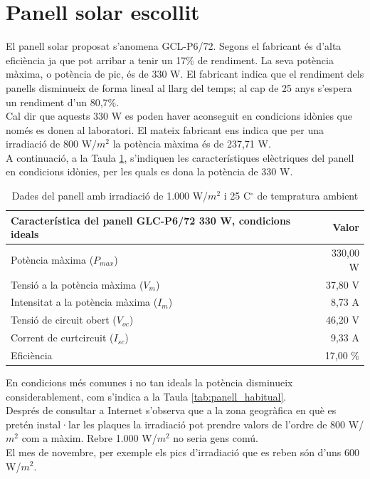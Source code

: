 \section{Panell solar escollit}
El panell solar proposat s'anomena GCL-P6/72. Segons el fabricant és d'alta eficiència ja que pot arribar a tenir un 17\% de rendiment. La seva potència màxima, o potència de pic, és de 330 W. El fabricant indica que el rendiment dels panells disminueix de forma lineal al llarg del temps; al cap de 25 anys s'espera un rendiment d'un 80,7\%.\\
\newline Cal dir que aquests 330 W es poden haver aconseguit en condicions idònies que només es donen al laboratori. El mateix fabricant ens indica que per una irradiació de 800 W/$m^2$ la potència màxima és de 237,71 W.\\
\newline A continuació, a la Taula \ref{tab:panell_ideal}, s'indiquen les característiques elèctriques del panell en condicions idònies, per les quals es dona la potència de 330 W.

\begin{table}[H]
\small
  \centering
    \begin{tabular} {|l|r|}
 \hline  
 \multicolumn{1}{|l|}{Característica del panell GLC-P6/72 330 W, condicions ideals} &  \multicolumn{1}{r|}{Valor} \\ \hline \hline
	Potència màxima ($P_{max}$) & 330,00 W \\ \hline
	Tensió a la potència màxima ($V_m$) & 37,80 V \\ \hline
	Intensitat a la potència màxima ($I_m$) & 8,73 A \\ \hline
	Tensió de circuit obert ($V_{oc}$) & 46,20 V \\ \hline
	Corrent de curtcircuit ($I_{sc}$) & 9,33 A \\ \hline
	Eficiència & 17,00 \% \\ \hline
    \end{tabular}%
    \caption{Dades del panell amb irradiació de 1.000 W/$m^2$ i 25 C$^\circ$ de tempratura ambient}
    \label{tab:panell_ideal}
\end{table}%

\noindent En condicions més comunes i no tan ideals la potència disminueix considerablement, com s'indica a la Taula \ref{tab:panell_habitual}.\\
\newline Després de consultar a Internet s'observa que a la zona geogràfica en què es pretén instal·lar les plaques la irradiació pot prendre valors de l'ordre de 800 W/$m^2$ com a màxim. Rebre 1.000 W/$m^2$ no seria gens comú.\\
\newline El mes de novembre, per exemple els pics d'irradiació que es reben són d'uns 600 W/$m^2$.

